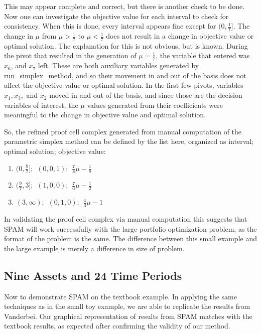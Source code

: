 \documentclass{article}
\begin{document}
This may appear complete and correct, but there is another check to be done. Now one can investigate the objective value for each interval to check for consistency. When this is done, every interval appears fine except for $(0, \frac{1}{7}]$. The change in $\mu$ from $\mu > \frac{1}{7}$ to $\mu < \frac{1}{7}$ does not result in a change in objective value or optimal solution. The explanation for this is not obvious, but is known. During the pivot that resulted in the generation of $\mu = \frac{1}{7}$, the variable that entered was $x_6$, and $x_7$ left. These are both auxiliary variables generated by {\selectfont run\_simplex\_method}, and so their movement in and out of the basis does not affect the objective value or optimal solution. In the first few pivots, variables $x_1, x_3,$ and $x_2$ moved in and out of the basis, and since those are the decision variables of interest, the $\mu$ values generated from their coefficients were meaningful to the change in objective value and optimal solution. 

So, the refined proof cell complex generated from manual computation of the parametric simplex method can be defined by the list here, organized as interval; optimal solution; objective value:

\begin{enumerate}
    \item $(0,\frac{9}{7}];\hspace{5pt} (0,0,1);\hspace{5pt} \frac{7}{8}\mu - \frac{1}{8}$
    \item $(\frac{9}{7}, 3];\hspace{5pt} (1,0,0);\hspace{5pt} \frac{7}{6}\mu - \frac{1}{2}$
    \item $(3,\infty);\hspace{5pt} (0,1,0);\hspace{5pt} \frac{4}{3}\mu - 1$
\end{enumerate}


In validating the proof cell complex via manual computation this suggests that SPAM will work successfully with the large portfolio optimization problem, as the format of the problem is the same. The difference between this small example and the large example is merely a difference in size of problem.

\subsection{Nine Assets and 24 Time Periods}
Now to demonstrate SPAM on the textbook example. In applying the same techniques as in the small toy example, we are able to replicate the results from Vanderbei. Our graphical representation of results from SPAM matches with the textbook results, as expected after confirming the validity of our method. 
\end{document}
